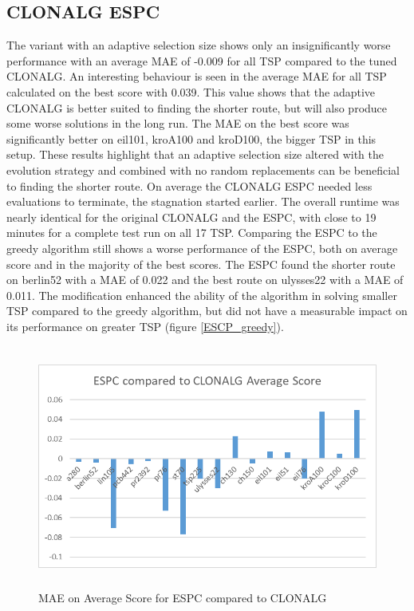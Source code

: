 \subsection{CLONALG ESPC}
The variant with an adaptive selection size shows only an insignificantly worse performance with an average MAE of -0.009 for all TSP compared to the tuned CLONALG. An interesting behaviour is seen in the average MAE for all TSP calculated on the best score with 0.039. This value shows that the adaptive CLONALG is better suited to finding the shorter route, but will also produce some worse solutions in the long run. The MAE on the best score was significantly better on eil101, kroA100 and kroD100, the bigger TSP in this setup. These results highlight that an adaptive selection size altered with the evolution strategy and combined with no random replacements can be beneficial to finding the shorter route. On average the CLONALG ESPC needed less evaluations to terminate, the stagnation started earlier. The overall runtime was nearly identical for the original CLONALG and the ESPC, with close to 19 minutes for a complete test run on all 17 TSP. Comparing the ESPC to the greedy algorithm still shows a worse performance of the ESPC, both on average score and in the majority of the best scores. The ESPC found the shorter route on berlin52 with a MAE of 0.022 and the best route on ulysses22 with a MAE of 0.011. The modification enhanced the ability of the algorithm in solving smaller TSP compared to the greedy algorithm, but did not have a measurable impact on its performance on greater TSP (figure \ref{ESCP_greedy}).\\
\begin{figure}[h]
\includegraphics[height=8cm,width=13cm]{Images/ESPC_Fig_Avg2.png}
\caption{MAE on Average Score for ESPC compared to CLONALG}
\label{ESCP_AVG}
\end{figure}
